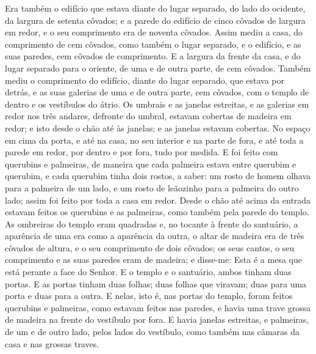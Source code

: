 Era também o edifício que estava diante do lugar separado, do
lado do ocidente, da largura de setenta côvados; e a parede do
edifício de cinco côvados de largura em redor, e o seu comprimento
era de noventa côvados. Assim mediu a casa, do comprimento de
cem côvados, como também o lugar separado, e o edifício, e as suas
paredes, cem côvados de comprimento. E a largura da frente da
casa, e do lugar separado para o oriente, de uma e de outra parte,
de cem côvados. Também mediu o comprimento do edifício,
diante do lugar separado, que estava por detrás, e as suas galerias
de uma e de outra parte, cem côvados, com o templo de dentro e os
vestíbulos do átrio. Os umbrais e as janelas estreitas, e as
galerias em redor nos três andares, defronte do umbral, estavam
cobertas de madeira em redor; e isto desde o chão até às janelas; e
as janelas estavam cobertas. No espaço em cima da porta, e
até na casa, no seu interior e na parte de fora, e até toda a parede
em redor, por dentro e por fora, tudo por medida. E foi feito
com querubins e palmeiras, de maneira que cada palmeira estava entre
querubim e querubim, e cada querubim tinha dois rostos, a
saber: um rosto de homem olhava para a palmeira de um lado, e um
rosto de leãozinho para a palmeira do outro lado; assim foi feito
por toda a casa em redor. Desde o chão até acima da entrada
estavam feitos os querubins e as palmeiras, como também pela parede
do templo. As ombreiras do templo eram quadradas e, no
tocante à frente do santuário, a aparência de uma era como a
aparência da outra, o altar de madeira era de três côvados de
altura, e o seu comprimento de dois côvados; os seus cantos, o seu
comprimento e as suas paredes eram de madeira; e disse-me: Esta é a
mesa que está perante a face do Senhor. E o templo e o
santuário, ambos tinham duas portas. E as portas tinham duas
folhas; duas folhas que viravam; duas para uma porta e duas para a
outra. E nelas, isto é, nas portas do templo, foram feitos
querubins e palmeiras, como estavam feitos nas paredes, e havia uma
trave grossa de madeira na frente do vestíbulo por fora. E
havia janelas estreitas, e palmeiras, de um e de outro lado, pelos
lados do vestíbulo, como também nas câmaras da casa e nas grossas
traves.

\medskip

